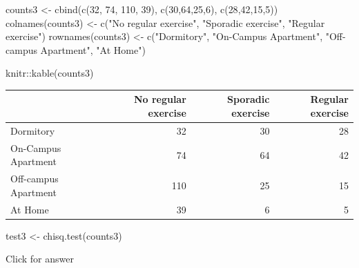 \documentclass[
]{book}
\newenvironment{Shaded}{\begin{snugshade}}{\end{snugshade}}
\newcommand{\DecValTok}[1]{\textcolor[rgb]{0.00,0.00,0.81}{#1}}
\newcommand{\FunctionTok}[1]{\textcolor[rgb]{0.00,0.00,0.00}{#1}}
\newcommand{\NormalTok}[1]{#1}
\newcommand{\OtherTok}[1]{\textcolor[rgb]{0.56,0.35,0.01}{#1}}
\newcommand{\SpecialCharTok}[1]{\textcolor[rgb]{0.00,0.00,0.00}{#1}}
\newcommand{\StringTok}[1]{\textcolor[rgb]{0.31,0.60,0.02}{#1}}
\begin{document}
\begin{Shaded}
\begin{Highlighting}[]
\NormalTok{counts3 }\OtherTok{\textless{}{-}} \FunctionTok{cbind}\NormalTok{(}\FunctionTok{c}\NormalTok{(}\DecValTok{32}\NormalTok{, }\DecValTok{74}\NormalTok{, }\DecValTok{110}\NormalTok{, }\DecValTok{39}\NormalTok{), }\FunctionTok{c}\NormalTok{(}\DecValTok{30}\NormalTok{,}\DecValTok{64}\NormalTok{,}\DecValTok{25}\NormalTok{,}\DecValTok{6}\NormalTok{), }\FunctionTok{c}\NormalTok{(}\DecValTok{28}\NormalTok{,}\DecValTok{42}\NormalTok{,}\DecValTok{15}\NormalTok{,}\DecValTok{5}\NormalTok{))}
\FunctionTok{colnames}\NormalTok{(counts3) }\OtherTok{\textless{}{-}} \FunctionTok{c}\NormalTok{(}\StringTok{"No regular exercise"}\NormalTok{, }\StringTok{"Sporadic exercise"}\NormalTok{, }\StringTok{"Regular exercise"}\NormalTok{) }
\FunctionTok{rownames}\NormalTok{(counts3) }\OtherTok{\textless{}{-}} \FunctionTok{c}\NormalTok{(}\StringTok{"Dormitory"}\NormalTok{, }\StringTok{"On{-}Campus Apartment"}\NormalTok{, }\StringTok{"Off{-}campus Apartment"}\NormalTok{, }\StringTok{"At Home"}\NormalTok{) }
\end{Highlighting}
\end{Shaded}

\begin{Shaded}
\begin{Highlighting}[]
\NormalTok{knitr}\SpecialCharTok{::}\FunctionTok{kable}\NormalTok{(counts3)}
\end{Highlighting}
\end{Shaded}

\begin{tabular}{l|r|r|r}
\hline
  & No regular exercise & Sporadic exercise & Regular exercise\\
\hline
Dormitory & 32 & 30 & 28\\
\hline
On-Campus Apartment & 74 & 64 & 42\\
\hline
Off-campus Apartment & 110 & 25 & 15\\
\hline
At Home & 39 & 6 & 5\\
\hline
\end{tabular}

\begin{Shaded}
\begin{Highlighting}[]
\NormalTok{test3 }\OtherTok{\textless{}{-}} \FunctionTok{chisq.test}\NormalTok{(counts3)}
\end{Highlighting}
\end{Shaded}

Click for answer
\end{document}
